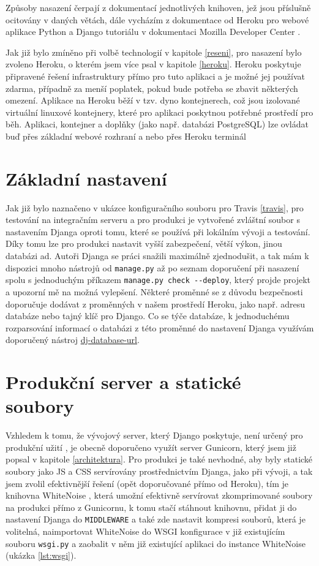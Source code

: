     Způsoby nasazení čerpají z dokumentací jednotlivých knihoven, jež jsou příslušně ocitovány v daných větách, dále vycházím z dokumentace od Heroku pro webové aplikace Python \cite{heroku-python} a Django tutoriálu v dokumentaci Mozilla Developer Center \cite{mdn-django}.
    
    Jak již bylo zmíněno při volbě technologií v kapitole \ref{reseni}, pro nasazení bylo zvoleno Heroku, o kterém jsem více psal v kapitole \ref{heroku}. Heroku poskytuje připravené řešení infrastruktury přímo pro tuto aplikaci a je možné jej používat zdarma, případně za menší poplatek, pokud bude potřeba se zbavit některých omezení. Aplikace na Heroku běží v tzv. dyno kontejnerech, což jsou izolované virtuální linuxové kontejnery, které pro aplikaci poskytnou potřebné prostředí pro běh. Aplikaci, kontejner a doplňky (jako např. databázi PostgreSQL) lze ovládat buď přes základní webové rozhraní a nebo přes Heroku terminál
    
    \section{Základní nastavení}\label{sec:zakladniNastaveni}
    Jak již bylo naznačeno v ukázce konfiguračního souboru pro Travis \ref{travis}, pro testování na integračním serveru a pro produkci je vytvořené zvláštní soubor s nastavením Djanga oproti tomu, které se používá při lokálním vývoji a testování. Díky tomu lze pro produkci nastavit vyšší zabezpečení, větší výkon, jinou databázi ad. Autoři Djanga se práci snažili maximálně zjednodušit, a tak mám k dispozici mnoho nástrojů od \verb|manage.py| až po seznam doporučení při nasazení \cite{django-checklist} spolu s jednoduchým příkazem \verb|manage.py check --deploy|, který projde projekt a upozorní mě na možná vylepšení. Některé proměnné se z důvodu bezpečnosti doporučuje dodávat z proměnných v našem prostředí Heroku, jako např. adresu databáze nebo tajný klíč pro Django. Co se týče databáze, k jednoduchému rozparsování informací o databázi z této proměnné do nastavení Djanga využívám doporučený nástroj \href{https://github.com/kennethreitz/dj-database-url}{dj-database-url}.
    
    \section{Produkční server a statické soubory}
    Vzhledem k tomu, že vývojový server, který Django poskytuje, není určený pro produkční užití \cite{django-managepy}, je obecně doporučeno využít server Gunicorn, který jsem již popsal v kapitole \ref{architektura}. Pro produkci je také nevhodné, aby byly statické soubory jako JS a CSS servírovány prostřednictvím Djanga, jako při vývoji, a tak jsem zvolil efektivnější řešení (opět doporučované přímo od Heroku), tím je knihovna WhiteNoise \cite{whitenoise}, která umožní efektivně servírovat zkomprimované soubory na produkci přímo z Gunicornu, k tomu stačí stáhnout knihovnu, přidat ji do nastavení Djanga do \verb|MIDDLEWARE| a také zde nastavit kompresi souborů, která je volitelná, naimportovat WhiteNoise do WSGI konfigurace v již existujícím souboru \verb|wsgi.py| a zaobalit v něm již existující aplikaci do instance WhiteNoise (ukázka \ref{lst:wsgi}).
    
